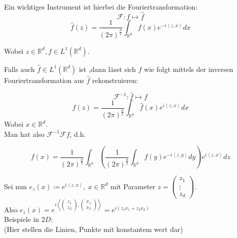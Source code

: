 \documentclass{article}
\theoremstyle{plain}
\theoremstyle{definition}
\numberwithin{equation}{section}
\newcommand{\skprod}[2]{
\left \langle #1,#2 \right \rangle
}
\newcommand{\R}[0] {
\mathbb R
}
\newcommand{\srmatrix}[1] {
\left( \begin{smallmatrix} #1 \end{smallmatrix} \right)
}
\newcommand{\x}[0] {
  \boldsymbol{x}
}
\begin{document}
    Ein wichtiges Instrument ist hierbei die Fouriertransformation:
    \[\mathcal F : f \mapsto \hat f\]
    \begin{equation}
        \boxed{\hat f(z) = \frac{1}{(2 \pi)^\frac{d}{2}} \int_{\R^d} f(x) e^{-i \skprod{z}{x}} dx}
    \end{equation}

    Wobei  $z \in \R^d, f \in L^1(\R^d)$.

    Falls auch $\hat f \in L^1(\R^d)$ ist ,dann lässt sich $f$ wie folgt mittels der inversen Fouriertransformation aus $\hat f$ rekonstruieren:

    \[\mathcal F^{-1} : \hat f \mapsto f\]
    \begin{equation}
        \boxed{f(z) = \frac{1}{(2 \pi)^\frac{d}{2}} \int_{\R^d} \hat f(x) e^{i \skprod{z}{x}} dx}
    \end{equation}
    Wobei $x \in \R^d$.\\

    Man hat also $\mathcal F^{-1} \mathcal F f$, d.h.

    \[f(x) = \frac{1}{(2 \pi)^\frac{d}{2}} \int_{\R^d} \left(\frac{1}{(2 \pi)^\frac{d}{2}} \int_{\R^d} f(y) e^{-i \skprod{z}{y}} dy\right) e^{i \skprod{z}{x}} dz\]

    Sei nun $e_z(x)  \coloneqq  e^{i \skprod{z}{x}}, \ x \in \R^d$ mit Parameter
$z = \srmatrix{z_1 \\ \vdots \\ z_d}$.\\
    Also $e_z(x) = e^{i\skprod{\srmatrix{z_1\\z_2}}{\srmatrix{x_1\\x_2}}} = e^{i (z_1 x_1 +z_2 x_2)}$\\
    Beispiele in $2D$:\\
    (Hier stellen die Linien, Punkte mit konstantem wert dar)
\end{document}
